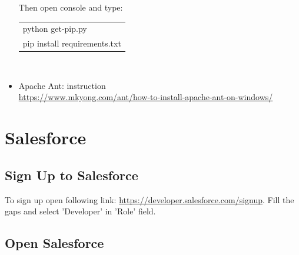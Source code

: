 \documentclass[12pt,a4paper]{article}
\begin{document}
\begin{itemize}
Then open console and type:\\
\begin{tabular}{|l|}
	\hline
	python get-pip.py\\
	pip install requirements.txt\\
	\hline
\end{tabular}\\
\item Apache Ant: instruction\\ \url{https://www.mkyong.com/ant/how-to-install-apache-ant-on-windows/} 

\end{itemize}

\section{Salesforce}
\subsection{Sign Up to Salesforce}
To sign up open following link: \url{https://developer.salesforce.com/signup}.
Fill the gaps and select 'Developer' in 'Role' field.

\subsection{Open Salesforce}
\end{document}
